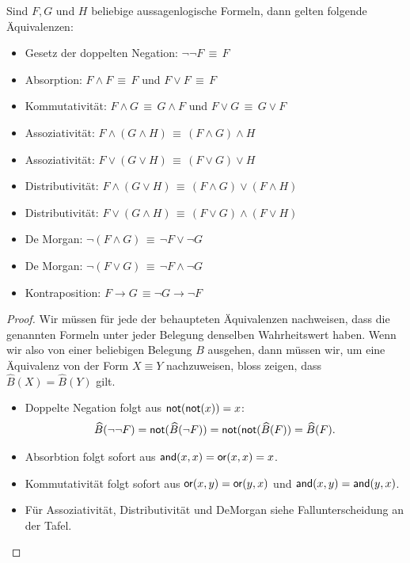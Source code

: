 \begin{satz}
    Sind $F,G$ und $H$ beliebige aussagenlogische Formeln, dann gelten folgende Äquivalenzen:
    \begin{itemize}
        \item Gesetz der doppelten Negation: $\neg\neg F\,\equiv\, F$
        \item Absorption: $F\land F\,\equiv\, F$ und $F\lor F\,\equiv\, F$
        \item Kommutativität: $F\land G\,\equiv\,G\land F$ und $F\lor G\,\equiv\, G\lor F$
        \item Assoziativität: $F\land(G\land H)\,\equiv\,(F\land G)\land H$
        \item Assoziativität: $F\lor(G\lor H)\,\equiv\,(F\lor G)\lor H$
        \item Distributivität: $F\land(G\lor H)\,\equiv\,(F\land G)\lor (F\land H)$
        \item Distributivität: $F\lor(G\land H)\,\equiv\,(F\lor G)\land (F\lor H)$
        \item De Morgan: $\neg (F\land G)\,\equiv\,\neg F\lor\neg G$
        \item De Morgan: $\neg (F\lor G)\,\equiv\,\neg F\land \neg G$
        \item Kontraposition: $F\to G\,\equiv\neg G\to\neg F$
    \end{itemize}
\end{satz}
\begin{proof}
    Wir müssen für jede der behaupteten Äquivalenzen nachweisen, dass die genannten Formeln unter jeder Belegung denselben Wahrheitswert haben. Wenn wir also von einer beliebigen Belegung $B$ ausgehen, dann müssen wir, um eine Äquivalenz von der Form $X\equiv Y$ nachzuweisen, bloss zeigen, dass $\widehat{B}(X)=\widehat{B}(Y)$ gilt.
    \begin{itemize}
        \item Doppelte Negation folgt aus $\mathsf{not}(\mathsf{not}(x))=x$:
        \begin{align*}
        \widehat{B}(\neg\neg F)=\mathsf{not}(\widehat{B}(\neg F))=\mathsf{not}(\mathsf{not}(\widehat{B}(F))=\widehat{B}(F).
        \end{align*}
        \item Absorbtion folgt sofort aus $\mathsf{and}(x,x)=\mathsf{or}(x,x) =x$.
        \item Kommutativität folgt sofort aus $\mathsf{or}(x,y)=\mathsf{or}(y,x)$ und $\mathsf{and}(x,y)=\mathsf{and}(y,x)$.
        \item Für Assoziativität, Distributivität und DeMorgan siehe Fallunterscheidung an der Tafel.
    \end{itemize}
\end{proof}

